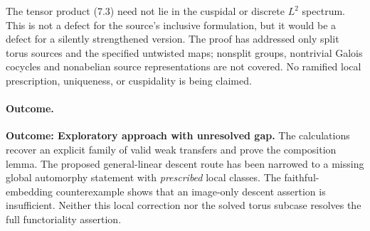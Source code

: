 \documentclass[11pt,a4paper]{article}
\begin{document}
The tensor product (7.3) need not lie in the cuspidal or discrete
$L^2$ spectrum. This is not a defect for the source's inclusive
formulation, but it would be a defect for a silently strengthened
version. The proof has addressed only split torus sources and the
specified untwisted maps; nonsplit groups, nontrivial Galois cocycles
and nonabelian source representations are not covered. No ramified
local prescription, uniqueness, or cuspidality is being claimed.

\paragraph{Outcome.}
\textbf{Outcome: Exploratory approach with unresolved gap.}
The calculations recover an explicit family of valid weak transfers
and prove the composition lemma. The proposed general-linear descent
route has been narrowed to a missing global automorphy statement with
\emph{prescribed} local classes. The faithful-embedding counterexample
shows that an image-only descent assertion is insufficient. Neither
this local correction nor the solved torus subcase resolves the full
functoriality assertion.
\end{document}
